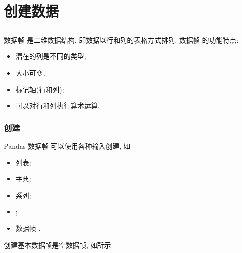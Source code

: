 \section{创建数据}
\subsection[DataFrame]{}
数据帧  是二维数据结构, 即数据以行和列的表格方式排列. 数据帧  的功能特点:%
%
\begin{itemize}
    \item 潜在的列是不同的类型;
    \item 大小可变;
    \item 标记轴(行和列);
    \item 可以对行和列执行算术运算.
\end{itemize}

\subsubsection{创建}
Pandas 数据帧  可以使用各种输入创建, 如%
%
\begin{itemize}
    \item 列表;
    \item 字典;
    \item 系列;
    \item {};
    \item 数据帧 .
\end{itemize}

创建基本数据帧是空数据帧, 如所示



\subsection[Panel]{}